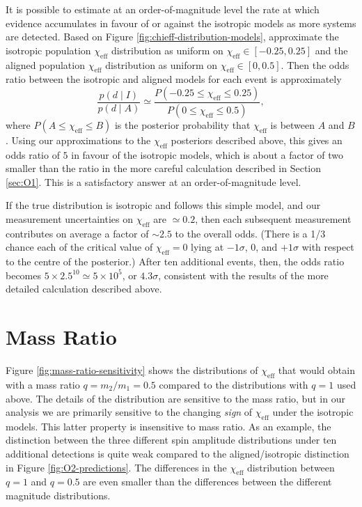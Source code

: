 \documentclass[modern,linenumbers]{aastex61}
\newcommand{\chieff}{\chi_\mathrm{eff}}
\begin{document}
It is possible to estimate at an order-of-magnitude level the rate at
which evidence accumulates in favour of or against the isotropic
models as more systems are detected.  Based on Figure
\ref{fig:chieff-distribution-models}, approximate the isotropic
population $\chieff$ distribution as uniform on
$\chieff \in \left[ -0.25, 0.25 \right]$ and the aligned population
$\chieff$ distribution as uniform on
$\chieff \in \left[0, 0.5\right]$.  Then the odds ratio between the
isotropic and aligned models for each event is approximately
\begin{equation}
  \label{eq:approx-odds}
  \frac{p\left( d \mid I \right)}{p\left( d \mid A \right)} \simeq
  \frac{P\left( -0.25 \leq \chieff \leq 0.25 \right)}{P\left( 0 \leq \chieff \leq 0.5 \right) },
\end{equation}
where $P\left( A \leq \chieff \leq B \right)$ is the posterior
probability that $\chieff$ is between $A$ and $B$.  Using our
approximations to the $\chieff$ posteriors described above, this gives
an odds ratio of $5$ in favour of the isotropic models, which is about
a factor of two smaller than the ratio in the more careful calculation
described in Section \ref{sec:O1}.  This is a satisfactory answer at
an order-of-magnitude level.

If the true distribution is isotropic and follows this simple model,
and our measurement uncertainties on $\chieff$ are $\simeq 0.2$, then
each subsequent measurement contributes on average a factor of
$\sim 2.5$ to the overall odds.  (There is a 1/3 chance each of the
critical value of $\chieff = 0$ lying at $-1\sigma$, $0$, and
$+1\sigma$ with respect to the centre of the posterior.)  After ten
additional events, then, the odds ratio becomes
$5 \times 2.5^{10} \simeq 5 \times 10^{5}$, or $4.3 \sigma$,
consistent with the results of the more detailed calculation described
above.

\section{Mass Ratio}
\label{sec:mass-ratio}

Figure \ref{fig:mass-ratio-sensitivity} shows the distributions of
$\chieff$ that would obtain with a mass ratio $q = m_2/m_1 = 0.5$
compared to the distributions with $q = 1$ used above.  The details of
the distribution are sensitive to the mass ratio, but in our analysis
we are primarily sensitive to the changing \emph{sign} of $\chieff$
under the isotropic models.  This latter property is insensitive to
mass ratio.  As an example, the distinction between the three
different spin amplitude distributions under ten additional detections
is quite weak compared to the aligned/isotropic distinction in Figure
\ref{fig:O2-predictions}.  The differences in the $\chieff$
distribution between $q = 1$ and $q = 0.5$ are even smaller than the
differences between the different magnitude distributions.
\end{document}
